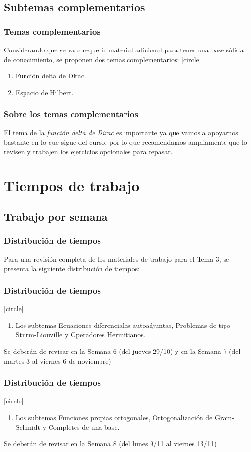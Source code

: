 \subsection{Subtemas complementarios}
\begin{frame}
\frametitle{Temas complementarios}
Considerando que se va a requerir material adicional para tener una base sólida de conocimiento, se proponen dos temas complementarios:
[circle]
\begin{enumerate}[<+->]
\item Función delta de Dirac.
\item Espacio de Hilbert.
\end{enumerate}
\end{frame}
\begin{frame}
\frametitle{Sobre los temas complementarios}
El tema de la \emph{función delta de Dirac} es importante ya que vamos a apoyarnos bastante en lo que sigue del curso, por lo que recomendamos ampliamente que lo revisen y trabajen los ejercicios opcionales para repasar.
\end{frame}
\section{Tiempos de trabajo}
\subsection{Trabajo por semana}
\begin{frame}
\frametitle{Distribución de tiempos}
Para una revisión completa de los materiales de trabajo para el Tema 3, se presenta la siguiente distribución de tiempos:
\end{frame}
\begin{frame}
\frametitle{Distribución de tiempos}
[circle]
\begin{enumerate}
\item Los subtemas Ecuaciones diferenciales autoadjuntas, Problemas de tipo Sturm-Liouville y Operadores Hermitianos.
\end{enumerate}
Se deberán de revisar en la Semana 6 (del jueves 29/10) y en la Semana 7 (del martes 3 al viernes 6 de noviembre)
\end{frame}
\begin{frame}
\frametitle{Distribución de tiempos}
[circle]
\begin{enumerate}
\item Los subtemas Funciones propias ortogonales, Ortogonalización de Gram-Schmidt y Completes de una base.
\end{enumerate}
Se deberán de revisar en la Semana 8 (del lunes 9/11 al viernes 13/11)
\end{frame}
